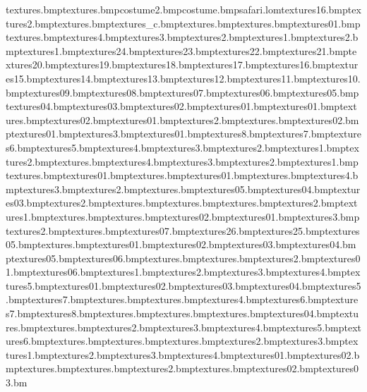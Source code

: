 textures\hutstripes.bmp textures\grassedge.bmp costume\safhat2.bmp costume\safarimonacle.bmp safari.lom textures\wpaper16.bmp textures\woodplank2.bmp textures\woodplank.bmp textures\wheel_c.bmp textures\wedcaketon.bmp textures\wedcakejane.bmp textures\wedcake01.bmp textures\wedcake.bmp textures\wbridge4.bmp textures\wbridge3.bmp textures\wbridge2.bmp textures\wbridge1.bmp textures\waterstone2.bmp textures\waterstone1.bmp textures\waterfall24.bmp textures\waterfall23.bmp textures\waterfall22.bmp textures\waterfall21.bmp textures\waterfall20.bmp textures\waterfall19.bmp textures\waterfall18.bmp textures\waterfall17.bmp textures\waterfall16.bmp textures\waterfall15.bmp textures\waterfall14.bmp textures\waterfall13.bmp textures\waterfall12.bmp textures\waterfall11.bmp textures\waterfall10.bmp textures\waterfall09.bmp textures\waterfall08.bmp textures\waterfall07.bmp textures\waterfall06.bmp textures\waterfall05.bmp textures\waterfall04.bmp textures\waterfall03.bmp textures\waterfall02.bmp textures\waterfall01.bmp textures\water01.bmp textures\water.bmp textures\wanted02.bmp textures\wanted01.bmp textures\wall2.bmp textures\wall.bmp textures\vines02.bmp textures\vines01.bmp textures\vine3.bmp textures\tyre01.bmp textures\tvbits8.bmp textures\tvbits7.bmp textures\tvbits6.bmp textures\tvbits5.bmp textures\tvbits4.bmp textures\tvbits3.bmp textures\tvbits2.bmp textures\tvbits1.bmp textures\trunkend2.bmp textures\trunkend.bmp textures\trunk4.bmp textures\trunk3.bmp textures\trunk2.bmp textures\trunk1.bmp textures\truckwheelarch.bmp textures\truckunderside01.bmp textures\trucktop.bmp textures\truckside01.bmp textures\truckback.bmp textures\treewall4.bmp textures\treewall3.bmp textures\treeleave2.bmp textures\treeend.bmp textures\trashcan05.bmp textures\trash04.bmp textures\trash03.bmp textures\tracksfade2.bmp textures\tracksfade.bmp textures\tracks.bmp textures\trackcorner.bmp textures\track2.bmp textures\track1.bmp textures\torch.bmp textures\test.bmp textures\taztop02.bmp textures\taztop01.bmp textures\slurp3.bmp textures\slurp2.bmp textures\slurp.bmp textures\slide07.bmp textures\sign26.bmp textures\sign25.bmp textures\anvil05.bmp textures\arrows.bmp textures\balls01.bmp textures\balls02.bmp textures\balls03.bmp textures\balls04.bmp textures\balls05.bmp textures\balls06.bmp textures\bandaid.bmp textures\bigpizza.bmp textures\bigpizza2.bmp textures\blucage01.bmp textures\bluhut06.bmp textures\bombbit1.bmp textures\bombbit2.bmp textures\bombbit3.bmp textures\bombbit4.bmp textures\bombbit5.bmp textures\box01.bmp textures\box02.bmp textures\box03.bmp textures\box04.bmp textures\box5.bmp textures\box7.bmp textures\branchend.bmp textures\bridgepiller.bmp textures\browtree4.bmp textures\browtree6.bmp textures\browtree7.bmp textures\browtree8.bmp textures\burgbun.bmp textures\burgmeat.bmp textures\burgtom.bmp textures\cablecar04.bmp textures\cake.bmp textures\cam.bmp textures\cam2.bmp textures\cam3.bmp textures\cam4.bmp textures\cam5.bmp textures\cam6.bmp textures\can.bmp textures\canhole.bmp textures\cardbox.bmp textures\cardbox2.bmp textures\cardbox3.bmp textures\cash1.bmp textures\cash2.bmp textures\cash3.bmp textures\cash4.bmp textures\choc01.bmp textures\choc02.bmp textures\chocblu.bmp textures\chocwap.bmp textures\chocwap2.bmp textures\clock.bmp textures\clock02.bmp textures\clock03.bm